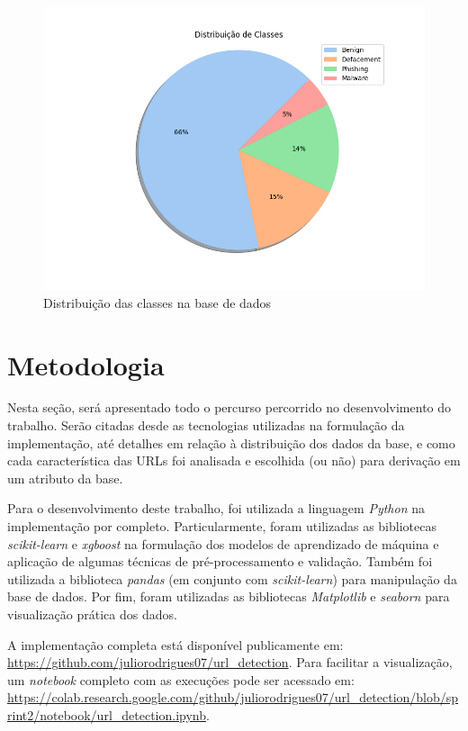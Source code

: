 \documentclass[a4paper, 12pt]{article}
\begin{document}
\begin{figure}[H]
    \centering
    \includegraphics[width=1\textwidth]{Images/Figure_1.png}
    \vspace*{-1.8cm}
    \caption{Distribuição das classes na base de dados}
    \label{fig:exampleFig1}
\end{figure}

\section{Metodologia}

Nesta seção, será apresentado todo o percurso percorrido no desenvolvimento do trabalho. Serão citadas desde as tecnologias utilizadas na formulação da implementação, até detalhes em relação à distribuição dos dados da base, e como cada característica das URLs foi analisada e escolhida (ou não) para derivação em um atributo da base. 

Para o desenvolvimento deste trabalho, foi utilizada a linguagem \emph{Python} na implementação por completo. Particularmente, foram utilizadas as bibliotecas \emph{scikit-learn} e \emph{xgboost} na formulação dos modelos de aprendizado de máquina e aplicação de algumas técnicas de pré-processamento e validação. Também foi utilizada a biblioteca \emph{pandas} (em conjunto com \emph{scikit-learn}) para manipulação da base de dados. Por fim, foram utilizadas as bibliotecas \emph{Matplotlib} e \emph{seaborn} para visualização prática dos dados.

A implementação completa está disponível publicamente em: \url{https://github.com/juliorodrigues07/url_detection}. Para facilitar a visualização, um \emph{notebook} completo com as execuções pode ser acessado em: \url{https://colab.research.google.com/github/juliorodrigues07/url_detection/blob/sprint2/notebook/url_detection.ipynb}.
\end{document}
